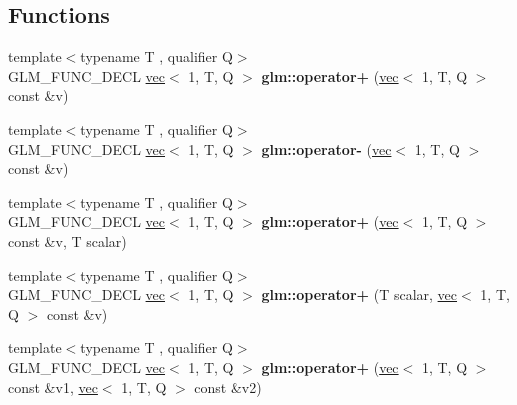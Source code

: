 \subsection*{Functions}
\begin{DoxyCompactItemize}
\item 
\mbox{\label{group__ext__vec1_gac2cf4da0dc267f31db88de168ea3169b}} 
{\footnotesize template$<$typename T , qualifier Q$>$ }\\G\+L\+M\+\_\+\+F\+U\+N\+C\+\_\+\+D\+E\+CL \hyperlink{structglm_1_1vec}{vec}$<$ 1, T, Q $>$ {\bfseries glm\+::operator+} (\hyperlink{structglm_1_1vec}{vec}$<$ 1, T, Q $>$ const \&v)
\item 
\mbox{\label{group__ext__vec1_gad2032db9362999ab1c27aae09816c9fd}} 
{\footnotesize template$<$typename T , qualifier Q$>$ }\\G\+L\+M\+\_\+\+F\+U\+N\+C\+\_\+\+D\+E\+CL \hyperlink{structglm_1_1vec}{vec}$<$ 1, T, Q $>$ {\bfseries glm\+::operator-\/} (\hyperlink{structglm_1_1vec}{vec}$<$ 1, T, Q $>$ const \&v)
\item 
\mbox{\label{group__ext__vec1_ga00b4b51068bde0730a3ed9ebeb254a24}} 
{\footnotesize template$<$typename T , qualifier Q$>$ }\\G\+L\+M\+\_\+\+F\+U\+N\+C\+\_\+\+D\+E\+CL \hyperlink{structglm_1_1vec}{vec}$<$ 1, T, Q $>$ {\bfseries glm\+::operator+} (\hyperlink{structglm_1_1vec}{vec}$<$ 1, T, Q $>$ const \&v, T scalar)
\item 
\mbox{\label{group__ext__vec1_ga9ce1879778cf852a8e5853db26138110}} 
{\footnotesize template$<$typename T , qualifier Q$>$ }\\G\+L\+M\+\_\+\+F\+U\+N\+C\+\_\+\+D\+E\+CL \hyperlink{structglm_1_1vec}{vec}$<$ 1, T, Q $>$ {\bfseries glm\+::operator+} (T scalar, \hyperlink{structglm_1_1vec}{vec}$<$ 1, T, Q $>$ const \&v)
\item 
\mbox{\label{group__ext__vec1_gadbe612a85d5c9d06f29d726d7998a8db}} 
{\footnotesize template$<$typename T , qualifier Q$>$ }\\G\+L\+M\+\_\+\+F\+U\+N\+C\+\_\+\+D\+E\+CL \hyperlink{structglm_1_1vec}{vec}$<$ 1, T, Q $>$ {\bfseries glm\+::operator+} (\hyperlink{structglm_1_1vec}{vec}$<$ 1, T, Q $>$ const \&v1, \hyperlink{structglm_1_1vec}{vec}$<$ 1, T, Q $>$ const \&v2)

\end{DoxyCompactItemize}
